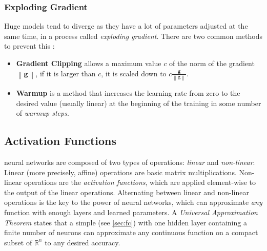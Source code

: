 \subsubsection*{Exploding Gradient}
Huge models tend to diverge as they have a lot of parameters adjusted at the same time, in a process called \emph{exploding gradient}.
There are two common methods to prevent this \cite{deeplearningbook}:
\begin{itemize}
    \item \textbf{Gradient Clipping} allows a maximum value $c$ of the norm of the gradient $\left\lVert \pmb{g} \right\rVert$, if it is larger than $c$, it is scaled down to $c \frac{\pmb{g}}{\left\lVert \pmb{g} \right\rVert}$.
    \item \textbf{Warmup} is a method that increases the learning rate from zero to the desired value (usually linear) at the beginning of the training in some number of \emph{warmup steps}.
\end{itemize}

\subsection{Activation Functions}
\label{sec:activations}
\dl neural networks are composed of two types of operations: \emph{linear} and \emph{non-linear}.
Linear (more precisely, affine) operations are basic matrix multiplications.
Non-linear operations are the \emph{activation functions}, which are applied element-wise to the output of the linear operations.
Alternating between linear and non-linear operations is the key to the power of \dl neural networks, which can approximate \emph{any} function with enough layers and learned parameters.
A \emph{Universal Approximation Theorem} \cite{universal_app_thm} states that a simple \fc (see \cref{sec:fc}) with one hidden layer containing a finite number of neurons can approximate any continuous function on a compact subset of $\mathbb{R}^n$ to any desired accuracy.

